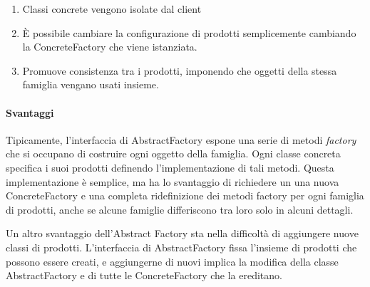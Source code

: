 \begin{enumerate}
  \item Classi concrete vengono isolate dal client
  \item È possibile cambiare la configurazione di prodotti semplicemente
    cambiando la ConcreteFactory che viene istanziata.
  \item Promuove consistenza tra i prodotti, imponendo che oggetti della stessa
    famiglia vengano usati insieme.
\end{enumerate}

\paragraph{ Svantaggi }

Tipicamente, l'interfaccia di AbstractFactory espone una serie di metodi
\emph{factory} che si occupano di costruire ogni oggetto della famiglia. Ogni
classe concreta specifica i suoi prodotti definendo l'implementazione di tali
metodi. Questa implementazione è semplice, ma ha lo svantaggio di richiedere un
una nuova ConcreteFactory e una completa ridefinizione dei metodi factory per
ogni famiglia di prodotti, anche se alcune famiglie differiscono tra loro solo
in alcuni dettagli.

Un altro svantaggio dell'Abstract Factory sta nella difficoltà di aggiungere
nuove classi di prodotti. L'interfaccia di AbstractFactory fissa l'insieme di
prodotti che possono essere creati, e aggiungerne di nuovi implica la modifica
della classe AbstractFactory e di tutte le ConcreteFactory che la ereditano.
